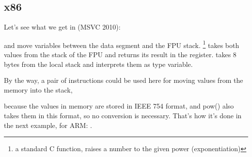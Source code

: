 \subsection{x86}

Let's see what we get in (MSVC 2010):




\FLD and \FSTP move variables between the data segment and the FPU stack. 
\footnote{a standard C function, raises a number to the given power (exponentiation)}
takes both values from the stack of the FPU and 
returns its result in the  register.
\printf takes 8 bytes from the local stack and interprets them as \Tdouble type variable.

\ifdefined\IncludeARM
By the way, a pair of \MOV instructions could be used here for moving values from the memory
into the stack, 

because the values in memory are stored in IEEE 754 format, and pow() also takes them in this
format, so no conversion is necessary.
That's how it's done in the next example, for ARM: .
\fi

